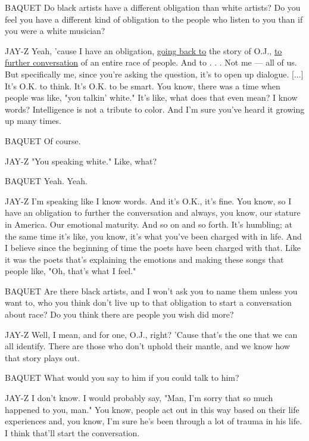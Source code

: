 BAQUET Do black artists have a different obligation than white artists?
Do you feel you have a different kind of obligation to the people who
listen to you than if you were a white musician?

JAY-Z Yeah, 'cause I have an obligation,
\href{https://www.nytimes3xbfgragh.onion/interactive/2016/02/01/arts/television/oj-simpson-murder-trial-coverage.html}{going
back to} the story of O.J.,
\href{https://www.nytimes3xbfgragh.onion/2017/11/17/opinion/jay-z-meek-mill-probation.html}{to
further conversation} of an entire race of people. And to . . . Not me
--- all of us. But specifically me, since you're asking the question,
it's to open up dialogue. {[}...{]} It's O.K. to think. It's O.K. to be
smart. You know, there was a time when people was like, "you talkin'
white." It's like, what does that even mean? I know words? Intelligence
is not a tribute to color. And I'm sure you've heard it growing up many
times.

BAQUET Of course.

JAY-Z "You speaking white." Like, what?

BAQUET Yeah. Yeah.

JAY-Z I'm speaking like I know words. And it's O.K., it's fine. You
know, so I have an obligation to further the conversation and always,
you know, our stature in America. Our emotional maturity. And so on and
so forth. It's humbling; at the same time it's like, you know, it's what
you've been charged with in life. And I believe since the beginning of
time the poets have been charged with that. Like it was the poets that's
explaining the emotions and making these songs that people like, "Oh,
that's what I feel."

BAQUET Are there black artists, and I won't ask you to name them unless
you want to, who you think don't live up to that obligation to start a
conversation about race? Do you think there are people you wish did
more?

JAY-Z Well, I mean, and for one, O.J., right? 'Cause that's the one that
we can all identify. There are those who don't uphold their mantle, and
we know how that story plays out.

BAQUET What would you say to him if you could talk to him?

JAY-Z I don't know. I would probably say, "Man, I'm sorry that so much
happened to you, man." You know, people act out in this way based on
their life experiences and, you know, I'm sure he's been through a lot
of trauma in his life. I think that'll start the conversation.

